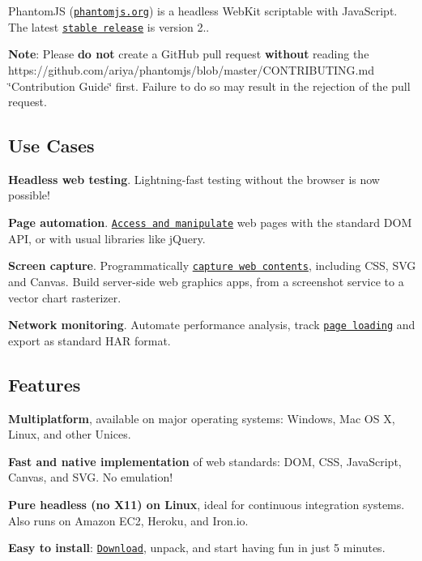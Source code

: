 Phantom\+JS (\href{http://phantomjs.org}{\tt phantomjs.\+org}) is a headless Web\+Kit scriptable with Java\+Script. The latest \href{http://phantomjs.org/release-2.0.html}{\tt stable release} is version 2..

{\bfseries Note}\+: Please {\bfseries do not} create a Git\+Hub pull request {\bfseries without} reading the https\+://github.com/ariya/phantomjs/blob/master/\+C\+O\+N\+T\+R\+I\+B\+U\+T\+I\+N\+G.\+md \char`\"{}\+Contribution Guide\char`\"{} first. Failure to do so may result in the rejection of the pull request.

\subsection*{Use Cases}


\begin{DoxyItemize}
\item {\bfseries Headless web testing}. Lightning-\/fast testing without the browser is now possible!
\item {\bfseries Page automation}. \href{http://phantomjs.org/page-automation.html}{\tt Access and manipulate} web pages with the standard D\+OM A\+PI, or with usual libraries like j\+Query.
\item {\bfseries Screen capture}. Programmatically \href{http://phantomjs.org/screen-capture.html}{\tt capture web contents}, including C\+SS, S\+VG and Canvas. Build server-\/side web graphics apps, from a screenshot service to a vector chart rasterizer.
\item {\bfseries Network monitoring}. Automate performance analysis, track \href{http://phantomjs.org/network-monitoring.html}{\tt page loading} and export as standard H\+AR format.
\end{DoxyItemize}

\subsection*{Features}


\begin{DoxyItemize}
\item {\bfseries Multiplatform}, available on major operating systems\+: Windows, Mac OS X, Linux, and other Unices.
\item {\bfseries Fast and native implementation} of web standards\+: D\+OM, C\+SS, Java\+Script, Canvas, and S\+VG. No emulation!
\item {\bfseries Pure headless (no X11) on Linux}, ideal for continuous integration systems. Also runs on Amazon E\+C2, Heroku, and Iron.\+io.
\item {\bfseries Easy to install}\+: \href{http://phantomjs.org/download.html}{\tt Download}, unpack, and start having fun in just 5 minutes.
\end{DoxyItemize}

